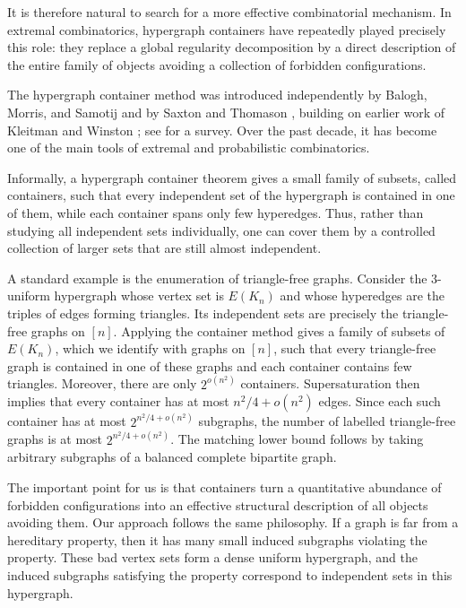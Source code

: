 \documentclass[11pt,reqno,letterpaper]{amsart}
\theoremstyle{plain}
\theoremstyle{remark}
\begin{document}
It is therefore natural to search for a more effective combinatorial mechanism. In extremal combinatorics, hypergraph containers have repeatedly played precisely this role: they replace a global regularity decomposition by a direct description of the entire family of objects avoiding a collection of forbidden configurations.

The hypergraph container method was introduced independently by Balogh, Morris, and Samotij \cite{balogh2015independent} and by Saxton and Thomason \cite{saxton2015hypergraph}, building on earlier work of Kleitman and Winston \cite{kleitman1982number}; see \cite{balogh2018method} for a survey. Over the past decade, it has become one of the main tools of extremal and probabilistic combinatorics.

Informally, a hypergraph container theorem gives a small family of subsets, called containers, such that every independent set of the hypergraph is contained in one of them, while each container spans only few hyperedges. Thus, rather than studying all independent sets individually, one can cover them by a controlled collection of larger sets that are still almost independent.

A standard example is the enumeration of triangle-free graphs. Consider the $3$-uniform hypergraph whose vertex set is $E(K_n)$ and whose hyperedges are the triples of edges forming triangles. Its independent sets are precisely the triangle-free graphs on $[n]$. Applying the container method gives a family of subsets of $E(K_n)$, which we identify with graphs on $[n]$, such that every triangle-free graph is contained in one of these graphs and each container contains few triangles. Moreover, there are only $2^{o(n^2)}$ containers. Supersaturation then implies that every container has at most $n^2/4+o(n^2)$ edges. Since each such container has at most $2^{n^2/4+o(n^2)}$ subgraphs, the number of labelled triangle-free graphs is at most $2^{n^2/4+o(n^2)}$. The matching lower bound follows by taking arbitrary subgraphs of a balanced complete bipartite graph.

The important point for us is that containers turn a quantitative abundance of forbidden configurations into an effective structural description of all objects avoiding them. Our approach follows the same philosophy. If a graph is far from a hereditary property, then it has many small induced subgraphs violating the property. These bad vertex sets form a dense uniform hypergraph, and the induced subgraphs satisfying the property correspond to independent sets in this hypergraph.
\end{document}
